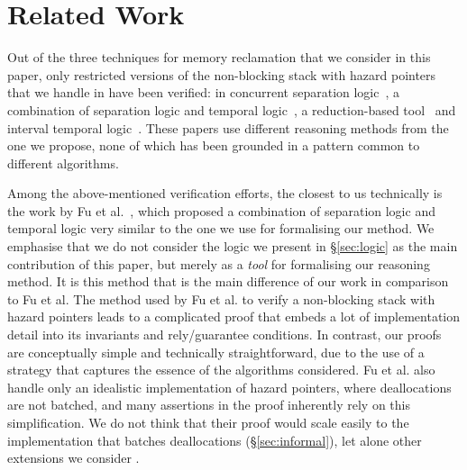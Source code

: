 \section{Related Work\label{sec:relwork}}

Out of the three techniques for memory reclamation that we consider in this
paper, only restricted versions of the non-blocking stack with hazard pointers
that we handle in \tr{\ref{sec:ProofsHazard}}{\nhazard} have been verified: in
concurrent separation logic~\cite{parkinson-hazard}, a combination of separation
logic and temporal logic~\cite{hazard-feng}, a reduction-based
tool~\cite{turkish} and interval temporal logic~\cite{kiv}. These papers use
different reasoning methods from the one we propose, none of which has been
grounded in a pattern common to different algorithms.


Among the above-mentioned verification efforts, the closest to us technically
is the work by Fu et al.~\cite{hazard-feng}, which proposed a combination of
separation logic and temporal logic very similar to the one we use for
formalising our method.
We emphasise that we do not consider the logic we present in \S\ref{sec:logic}
as the main contribution of this paper, but merely as a {\em tool} for
formalising our reasoning method.
It is this method that is the main difference of our work in comparison to Fu et
al.  The method used by Fu et al. to verify a non-blocking stack with hazard
pointers leads to a complicated proof that embeds a lot of implementation detail
into its invariants and rely/guarantee conditions. In contrast, our proofs are
conceptually simple and technically straightforward, due to the use of a strategy
that captures the essence of the algorithms considered. Fu et al. also handle
only an idealistic implementation of hazard pointers, where deallocations are
not batched, and many assertions in the proof inherently rely on this
simplification. We do not think that their proof would scale easily to the
implementation that batches deallocations (\S\ref{sec:informal}), let alone
other extensions we consider \tr{\ref{sec:ProofsHazard}}{\nhazard}.
 
